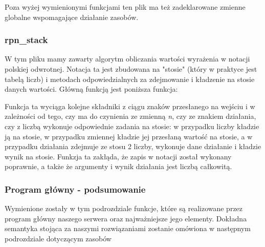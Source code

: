 Poza wyżej wymienionymi funkcjami ten plik ma też zadeklarowane zmienne globalne wspomagające działanie zasobów.

\subsubsection{rpn\_stack}

W tym pliku mamy zawarty algorytm obliczania wartości wyrażenia w notacji polskiej odwrotnej. Notacja ta jest zbudowana na "stosie" (który w praktyce jest tabelą liczb) i metodach odpowiedzialnych za zdejmowanie i kładzenie na stosie danych wartości. Główną funkcją jest poniższa funkcja:

\vspace{0.5cm}

\vspace{0.5cm}

Funkcja ta wyciąga kolejne składniki z ciągu znaków przesłanego na wejściu i w zależności od tego, czy ma do czynienia ze zmienną \textit{n}, czy ze znakiem działania, czy z liczbą wykonuje odpowiednie zadania na stosie: w przypadku liczby kładzie ją na stosie, w przypadku zmiennej kładzie jej przesłaną wartość na stosie, a w przypadku działania zdejmuje ze stosu 2 liczby, wykonuje dane działanie i kładzie wynik na stosie. Funkzja ta zakłąda, że zapis w notacji został wykonany poprawnie, a także że argumenty i wynik działania jest liczbą całkowitą.

\subsubsection{Program główny - podsumowanie}

Wymienione zostały w tym podrozdziale funkcje, które są realizowane przez program główny naszego serwera oraz najważniejsze jego elementy. Dokładna semantyka stojąca za naszymi rozwiązaniami zostanie omówiona w następnym podrozdziale dotyczącym zasobów
